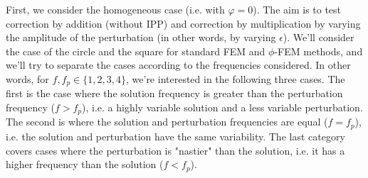 First, we consider the homogeneous case (i.e. with $\varphi=0$). The aim is to test correction by addition (without IPP) and correction by multiplication by varying the amplitude of the perturbation (in other words, by varying $\epsilon$). We'll consider the case of the circle and the square for standard FEM and $\phi$-FEM methods, and we'll try to separate the cases according to the frequencies considered. In other words, for $f,f_p\in\{1,2,3,4\}$, we're interested in the following three cases. The first is the case where the solution frequency is greater than the perturbation frequency ($f>f_p$), i.e. a highly variable solution and a less variable perturbation. The second is where the solution and perturbation frequencies are equal ($f=f_p$), i.e. the solution and perturbation have the same variability. The last category covers cases where the perturbation is "nastier" than the solution, i.e. it has a higher frequency than the solution ($f<f_p$).

